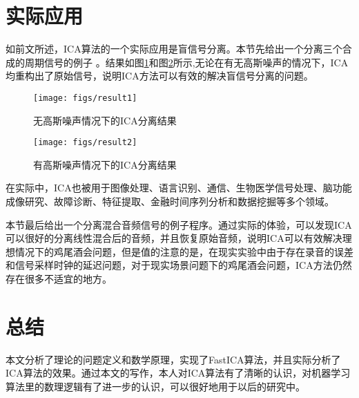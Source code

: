 \documentclass[UTF8,zihao=5,a4paper]{ctexart}
\begin{document}



\section{实际应用}
如前文所述，ICA算法的一个实际应用是盲信号分离。本节先给出一个分离三个合成的周期信号的例子\cite{example} 。结果如图\ref{fig:result1}和图\ref{fig:result2}所示,无论在有无高斯噪声的情况下，ICA均重构出了原始信号，说明ICA方法可以有效的解决盲信号分离的问题。

\begin{figure}[h]
    \centering
    \texttt{[image: figs/result1]}
    \caption{无高斯噪声情况下的ICA分离结果}
    \label{fig:result1}
\end{figure}


\begin{figure}[h]
    \centering
    \texttt{[image: figs/result2]}
    \caption{有高斯噪声情况下的ICA分离结果}
    \label{fig:result2}
\end{figure}

在实际中，ICA也被用于图像处理、语言识别、通信、生物医学信号处理、脑功能成像研究、故障诊断、特征提取、金融时间序列分析和数据挖掘等多个领域。

本节最后给出一个分离混合音频信号的例子程序。通过实际的体验，可以发现ICA可以很好的分离线性混合后的音频，并且恢复原始音频，说明ICA可以有效解决理想情况下的鸡尾酒会问题，但是值的注意的是，在现实实验中由于存在录音的误差和信号采样时钟的延迟问题，对于现实场景问题下的鸡尾酒会问题，ICA方法仍然存在很多不适宜的地方。

\section{总结}
本文分析了理论的问题定义和数学原理，实现了FastICA算法，并且实际分析了ICA算法的效果。通过本文的写作，本人对ICA算法有了清晰的认识，对机器学习算法里的数理逻辑有了进一步的认识，可以很好地用于以后的研究中。

% 

\end{document}
